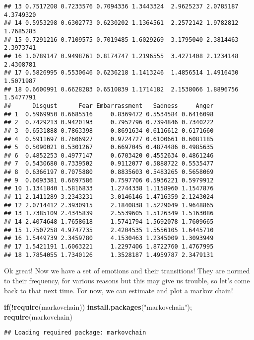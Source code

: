 \documentclass[
]{article}
\newenvironment{Shaded}{\begin{snugshade}}{\end{snugshade}}
\newcommand{\ControlFlowTok}[1]{\textcolor[rgb]{0.13,0.29,0.53}{\textbf{#1}}}
\newcommand{\KeywordTok}[1]{\textcolor[rgb]{0.13,0.29,0.53}{\textbf{#1}}}
\newcommand{\NormalTok}[1]{#1}
\newcommand{\OperatorTok}[1]{\textcolor[rgb]{0.81,0.36,0.00}{\textbf{#1}}}
\newcommand{\StringTok}[1]{\textcolor[rgb]{0.31,0.60,0.02}{#1}}
\begin{document}
\begin{verbatim}
## 13 0.7517208 0.7233576 0.7094336 1.3443324  2.9625237 2.0785187 4.3749320
## 14 0.5953298 0.6302773 0.6230202 1.1364561  2.2572142 1.9782812 1.7685283
## 15 0.7291216 0.7109575 0.7019485 1.6029269  3.1795040 2.3814463 2.3973741
## 16 1.0789147 0.9498761 0.8174747 1.2196555  3.4271408 2.1234148 2.4308781
## 17 0.5826995 0.5530646 0.6236218 1.1413246  1.4856514 1.4916430 1.5071987
## 18 0.6600991 0.6628283 0.6510839 1.1714182  2.1538066 1.8896756 1.5477791
##      Disgust      Fear Embarrassment   Sadness     Anger
## 1  0.5969950 0.6685516     0.8369472 0.5534584 0.6416098
## 2  0.7429213 0.9420193     0.7952796 0.7394846 0.7340222
## 3  0.6531888 0.7863398     0.8691634 0.6116612 0.6171660
## 4  0.5911697 0.7606927     0.9724727 0.6100661 0.6081185
## 5  0.5090021 0.5301267     0.6697045 0.4874486 0.4985635
## 6  0.4852253 0.4977147     0.6703420 0.4552634 0.4861246
## 7  0.5430680 0.7339502     0.9112077 0.5888722 0.5535477
## 8  0.6366197 0.7075880     0.8835603 0.5483265 0.5658069
## 9  0.6093381 0.6697586     0.7597706 0.5936221 0.5979912
## 10 1.1341840 1.5816833     1.2744338 1.1158960 1.1547876
## 11 2.1411289 3.2343231     3.0146146 1.4716359 2.1243024
## 12 2.0714412 2.3930915     2.1840838 1.5229049 1.9648865
## 13 1.7385109 2.4345839     2.5539605 1.5126349 1.5163086
## 14 2.4074648 1.7658618     1.5741794 1.5692078 1.7609665
## 15 1.7507258 4.9747735     2.4204535 1.5556105 1.6445710
## 16 1.5449739 2.3459780     4.1530463 1.2345009 1.3093949
## 17 1.5421191 1.6063221     1.2297406 1.8722760 1.4767995
## 18 1.7854055 1.7340126     1.3528187 1.4959787 2.3479131
\end{verbatim}

Ok great! Now we have a set of emotions and their transitions! They are
normed to their frequency, for various reasons but this may give us
trouble, so let's come back to that next time. For now, we can estimate
and plot a markov chain!

\begin{Shaded}
\begin{Highlighting}[]
\ControlFlowTok{if}\NormalTok{(}\OperatorTok{!}\KeywordTok{require}\NormalTok{(markovchain)) }\KeywordTok{install.packages}\NormalTok{(}\StringTok{"markovchain"}\NormalTok{); }\KeywordTok{require}\NormalTok{(markovchain)}
\end{Highlighting}
\end{Shaded}

\begin{verbatim}
## Loading required package: markovchain
\end{verbatim}
\end{document}
